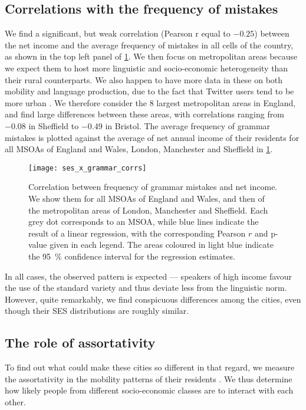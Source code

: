 \documentclass[../thesis.tex]{subfiles}
\begin{document}
\subsection{Correlations with the frequency of mistakes}
We find a significant, but weak correlation (Pearson r equal to $-0.25$) between the net
income and the average frequency of mistakes in all cells of the country, as shown in
the top left panel of \cref{fig:ses_x_grammar_corrs}. We then focus on metropolitan
areas because we expect them to host more linguistic and socio-economic heterogeneity
than their rural counterparts. We also happen to have more data in these on both
mobility and language production, due to the fact that Twitter users tend to be more
urban \cite{MisloveUnderstandingDemographics2011}. We therefore consider the $8$ largest
metropolitan areas in England, and find large differences between these areas, with
correlations ranging from $-0.08$ in Sheffield to $-0.49$ in Bristol. The average frequency
of grammar mistakes is plotted against the average of net annual income of their
residents for all \acp{MSOA} of England and Wales, London, Manchester and Sheffield in
\cref{fig:ses_x_grammar_corrs}.
\begin{figure}
\centering
  \texttt{[image: ses\_x\_grammar\_corrs]}
  \caption{ Correlation between frequency of grammar mistakes and net income. We show
  them for all \acp{MSOA} of England and Wales, and then of the metropolitan areas of
  London, Manchester and Sheffield. Each grey dot corresponds to an \ac{MSOA}, while
  blue lines indicate the result of a linear regression, with the corresponding Pearson
  $r$ and p-value given in each legend. The areas coloured in light blue indicate the
  \SI{95}{\percent} confidence interval for the regression estimates.}
  \label{fig:ses_x_grammar_corrs}
\end{figure}
In all cases, the observed pattern is expected --- speakers of high income favour the
use of the standard variety and thus deviate less from the linguistic norm. However,
quite remarkably, we find conspicuous differences among the cities, even though their
\ac{SES} distributions are roughly similar. 


\subsection{The role of assortativity}
To find out what could make these cities so different in that regard, we measure the
assortativity in the mobility patterns of their residents
\cite{HilmanSocioeconomicBiases2022}. We thus determine how likely people from different
socio-economic classes are to interact with each other.
\end{document}

